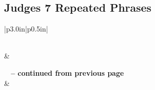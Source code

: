 \subsection{Judges 7 Repeated Phrases}


\normalsize
 
\begin{center}
\begin{longtable}{|p{3.0in}|p{0.5in}|}
\caption[Judge 7 Repeated Phrases]{Judges 7 Repeated Phrases}\label{table:Repeated Phrases Judges 7} \\
\hline {} &  \\ \hline 
\endfirsthead
 
{{\bfseries \tablename\ \thetable{} -- continued from previous page}} \\  
\hline {} &  \\ \hline 
\endhead
 

\end{longtable}
\end{center}
